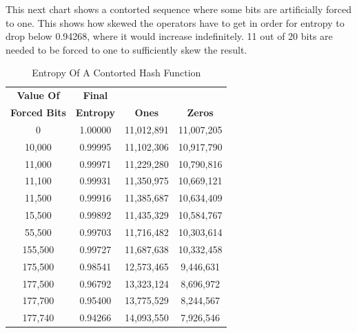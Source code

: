 \documentclass[preprint]{sigplanconf}
\begin{document}
This next chart shows a contorted sequence where some bits are artificially forced to one. This shows how skewed the operators have to get in order for entropy to drop below 0.94268, where it would increase indefinitely. 11 out of 20 bits are needed to be forced to one to sufficiently skew the result.

\begin{table} [ht]
    \begin{center}
        \begin{tabular}{|c|c|c|c|}
            \hline
            \textbf{Value Of}    & \textbf{Final}   &               &                \\
            \textbf{Forced Bits} & \textbf{Entropy} & \textbf{Ones} & \textbf{Zeros} \\
            \hline
            0                    & 1.00000          & 11,012,891    & 11,007,205     \\
            10,000               & 0.99995          & 11,102,306    & 10,917,790     \\
            11,000               & 0.99971          & 11,229,280    & 10,790,816     \\
            11,100               & 0.99931          & 11,350,975    & 10,669,121     \\
            11,500               & 0.99916          & 11,385,687    & 10,634,409     \\
            15,500               & 0.99892          & 11,435,329    & 10,584,767     \\
            55,500               & 0.99703          & 11,716,482    & 10,303,614     \\
            155,500              & 0.99727          & 11,687,638    & 10,332,458     \\
            175,500              & 0.98541          & 12,573,465    & 9,446,631      \\
            177,500              & 0.96792          & 13,323,124    & 8,696,972      \\
            177,700              & 0.95400          & 13,775,529    & 8,244,567      \\
            177,740              & 0.94266          & 14,093,550    & 7,926,546      \\
            \hline
        \end{tabular}
        \caption{Entropy Of A Contorted Hash Function}
        \label{tab-7}
    \end{center}
\end{table}
\end{document}
